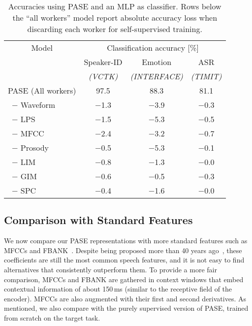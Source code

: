 \documentclass[a4paper]{article}
\begin{document}
\begin{table}[t]
\centering
\caption{Accuracies using PASE and an MLP as classifier. Rows below the ``all workers'' model report absolute accuracy loss when discarding each worker for self-supervised training.}
\label{tab:ablation}
\setlength{\tabcolsep}{4pt}
\begin{tabular}{l|ccc}
    \hline 
     \multicolumn{1}{c|}{Model} & \multicolumn{3}{c}{Classification accuracy [\%]} \\
            & Speaker-ID & Emotion & ASR \\
            & \textit{(VCTK)} & \textit{(INTERFACE)} & \textit{(TIMIT)} \\
     \hline
     
PASE (All workers)  & 97.5 & 88.3 &  81.1\\

~$-$ Waveform & $-$1.3 & $-$3.9 & $-$0.3 \\
     
~$-$ LPS & $-$1.5 & $-$5.3 & $-$0.5 \\
    
~$-$ MFCC & $-$2.4 & $-$3.2 & $-$0.7 \\
     
~$-$ Prosody & $-$0.5 & $-$5.3 & $-$0.1 \\

~$-$ LIM & $-$0.8 & $-$1.3 & $-$0.0 \\

~$-$ GIM & $-$0.6 & $-$0.5  & $-$0.3 \\

~$-$ SPC & $-$0.4 & $-$1.6 & $-$0.0 \\

     \hline
\end{tabular}
\end{table}


\subsection{Comparison with Standard Features}

We now compare our PASE representations with more standard features such as MFCCs and FBANK~\cite{brian_mcfee_2019_2564164}. Despite being proposed more than 40 years ago~\cite{Davis80-COP}, these coefficients are still the most common speech features, and it is not easy to find alternatives that consistently outperform them. To provide a more fair comparison, MFCCs and FBANK are gathered in context windows that embed contextual information of about 150\,ms (similar to the receptive field of the encoder). MFCCs are also augmented with their first and second derivatives. As mentioned, we also compare with the purely supervised version of PASE, trained from scratch on the target task.  
\end{document}
